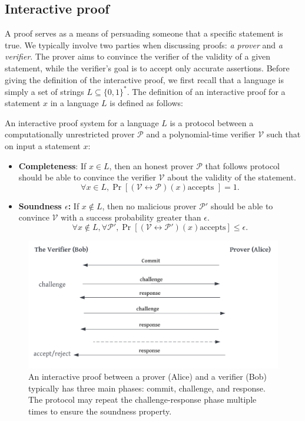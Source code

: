 \documentclass[cryptography,review,submit,pdftex,moreauthors,amsmath,amssymb,aps,strict]{Definitions/mdpi}
\begin{document}
\subsection{Interactive proof}
A proof serves as a means of persuading someone that a specific statement is true. We typically involve two parties when discussing proofs: \textit{a prover} and \textit{a verifier}. The prover aims to convince the verifier of the validity of a given statement, while the verifier's goal is to accept only accurate assertions. Before giving the definition of the interactive proof, we first recall that a language is simply a set of strings $L\subseteq \{0,1\}^*$. The definition of an interactive proof for a statement $x$ in a language $L$ is defined as follows:

\begin{Definition}
    An interactive proof system for a language $L$ is a protocol between a computationally unrestricted prover $\mathcal{P}$ and a polynomial-time verifier $\mathcal{V}$ such that on input a statement $x$:
    \begin{itemize}
        \item \textbf{Completeness}: If $x\in L$, then an honest prover $\mathcal{P}$ that follows protocol should be able to convince the verifier $\mathcal{V}$ about the validity of the statement. 
        $$\forall x\in L, \Pr[(\mathcal{V}\leftrightarrow \mathcal{P})(x) \text{accepts }]=1.$$
        \item \textbf{Soundness $\epsilon$:} If $x \notin L$, then no malicious prover $\mathcal{P}'$ should be able to convince $\mathcal{V}$  with a success probability greater than $\epsilon$.
        $$\forall x\notin L, \forall \mathcal{P}', \Pr[(\mathcal{V}\leftrightarrow \mathcal{P}')(x) \text{accepts}]\leq \epsilon.$$
    \end{itemize}
\end{Definition}
\begin{figure}[!htb]
	\centering
	\includegraphics[scale = 0.35]{figures/IP.pdf}
	\caption{An interactive proof between a prover (Alice) and a verifier (Bob) typically has three main phases: commit, challenge, and response. The protocol may repeat the challenge-response phase multiple times to ensure the soundness property.}\label{fig:ip}
\end{figure}
\end{document}
